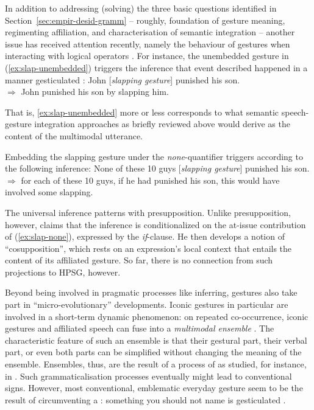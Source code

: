 \documentclass[output=paper]{langsci/langscibook}
\begin{document}
In addition to addressing (solving) the three basic questions identified in Section~\ref{sec:empir-desid-gramm} -- roughly, foundation of gesture meaning, regimenting affiliation, and characterisation of semantic integration -- another issue has received attention recently, namely the  behaviour of gestures when interacting with logical operators \citep{Ebert:2014:a,Schlenker:2018}.
%
For instance, the unembedded gesture in (\ref{ex:slap-unembedded}) triggers the inference that event described happened in a manner gesticulated \citep[]{Schlenker:2018}:
%
\ea \label{ex:slap-unembedded}
John [\textit{slapping gesture}] punished his son. \\
$\Rightarrow$ John punished his son by slapping him.
\z

That is, \ref{ex:slap-unembedded} more or less corresponds to what semantic speech-gesture integration approaches as briefly reviewed above would derive as the content of the multimodal utterance.

Embedding the slapping gesture under the \textit{none}-quantifier triggers according to \citet[]{Schlenker:2018} the following inference:
%
\ea \label{ex:slap-none}
None of these 10 guys [\textit{slapping gesture}] punished his son. \\
$\Rightarrow$ for each of these 10 guys, if he had punished his son, this would have involved some slapping.
\z

The universal inference patterns with presupposition.
%
Unlike presupposition, however, \citet[]{Schlenker:2018} claims that the inference is conditionalized on the at-issue contribution of (\ref{ex:slap-none}), expressed by the \textit{if}-clause. 
%
He then develops a notion of \enquote{cosupposition},  which rests on an expression's local context that entails the content of its affiliated gesture.
%
So far, there is no connection from such projections to HPSG, however.


Beyond being involved in pragmatic processes like inferring, gestures also take part in \enquote{micro-evolutionary} developments.
%
Iconic gestures in particular are involved in a short-term dynamic phenomenon:
%
on repeated co-occurrence, iconic gestures and affiliated speech can fuse into a \emph{multimodal ensemble} \citep{Kendon:2004,Luecking:Mehler:Menke:2008,Mehler:Luecking:2012:d}.  
%
The characteristic feature of such an ensemble is that their gestural part, their verbal part, or even both parts can be simplified without changing the meaning of the ensemble.
%
Ensembles, thus, are the result of a process of  as studied, for instance, in  \citet{Galantucci:Garrod:2011}.
%
Such grammaticalisation processes  eventually might lead to conventional signs.
%
However, most conventional, emblematic everyday gesture seem to be the result of circumventing a : something you should not name is gesticulated \citep{Posner:2002}. 
 
\end{document}
